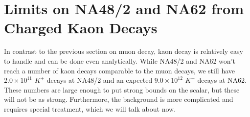 \section{Limits on NA48/2 and NA62 from Charged Kaon Decays}
In contrast to the previous section on muon decay, kaon decay is relatively easy to handle and can be done even analytically.
While NA48/2 and NA62 won't reach a number of kaon decays comparable to the muon decays, we still have $2.0 \times 10^{11}$ $K^+$ decays at NA48/2 and an expected $9.0 \times 10^{12}$ $K^+$ decays at NA62.
These numbers are large enough to put strong bounds on the scalar, but these will not be as strong.
Furthermore, the background is more complicated and requires special treatment, which we will talk about now.

